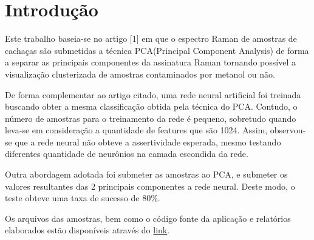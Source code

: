 \documentclass{article}
\begin{document}
\pagestyle{empty} 
\sloppy
{}

\begin{abstract}
O presente trabalho valida a utilização de redes neurais artificiais na interpretação de dados do espectro Raman de amostras de cachaça. Combinando a modelagem a técnica PCA(Principal Component Analysis) de forma a maximizar a taxa de sucesso obtida. \vspace{1cm}
\end{abstract}

\section{Introdução}
\vspace{1cm} 
Este trabalho baseia-se no artigo [1] em que o espectro Raman de amostras de cachaças são submetidas a técnica PCA(Principal Component Analysis) de forma a separar as principais componentes da assinatura Raman tornando possível a visualização clusterizada de amostras contaminados por metanol ou não.

De forma complementar ao artigo citado, uma rede neural artificial foi treinada buscando obter a mesma classificação obtida pela técnica do PCA. Contudo, o número de amostras para o treinamento da rede é pequeno, sobretudo quando leva-se em consideração a quantidade de features que são 1024. Assim, observou-se que a rede neural não obteve a assertividade esperada, mesmo testando diferentes quantidade de neurônios na camada escondida da rede.

Outra abordagem adotada foi submeter as amostras ao PCA, e submeter os valores resultantes das 2 principais componentes a rede neural. Deste modo, o teste obteve uma taxa de sucesso de 80\%.

Os arquivos das amostras, bem como o código fonte da aplicação e relatórios elaborados estão disponíveis através do \href{https://github.com/danielscosta/mestrado/tree/master/disciplinas/Inteligencia_Artificial/projeto}{link}.
\end{document}
